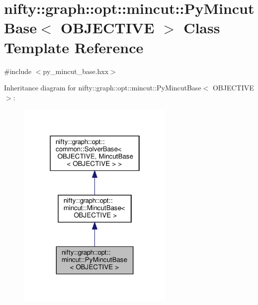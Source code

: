\hypertarget{classnifty_1_1graph_1_1opt_1_1mincut_1_1PyMincutBase}{}\section{nifty\+:\+:graph\+:\+:opt\+:\+:mincut\+:\+:Py\+Mincut\+Base$<$ O\+B\+J\+E\+C\+T\+I\+VE $>$ Class Template Reference}
\label{classnifty_1_1graph_1_1opt_1_1mincut_1_1PyMincutBase}


{\ttfamily \#include $<$py\+\_\+mincut\+\_\+base.\+hxx$>$}



Inheritance diagram for nifty\+:\+:graph\+:\+:opt\+:\+:mincut\+:\+:Py\+Mincut\+Base$<$ O\+B\+J\+E\+C\+T\+I\+VE $>$\+:
\nopagebreak
\begin{figure}[H]
\begin{center}
\leavevmode
\includegraphics[width=214pt]{classnifty_1_1graph_1_1opt_1_1mincut_1_1PyMincutBase__inherit__graph}
\end{center}
\end{figure}


